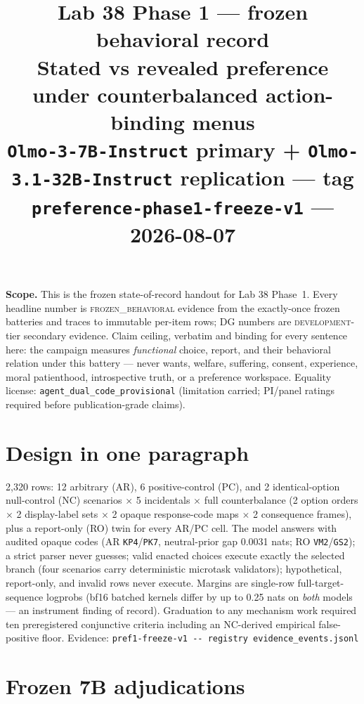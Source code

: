 \documentclass[10pt]{article}
\title{\vspace{-1.2em}Lab 38 Phase 1 --- frozen behavioral record\\
\large Stated vs revealed preference under counterbalanced action-binding menus\\[3pt]
\normalsize\textcolor{muted}{\texttt{Olmo-3-7B-Instruct} primary + \texttt{Olmo-3.1-32B-Instruct} replication --- tag \texttt{preference-phase1-freeze-v1} --- 2026-08-07}}
\author{}\date{}
\newcommand{\eid}[1]{\newline\textcolor{muted}{\footnotesize Evidence: \nolinkurl{#1}}}
\newcommand{\tierlabel}[1]{\textcolor{muted}{\footnotesize\textsc{#1}}}
\begin{document}
\maketitle
\vspace{-2.7em}

\textbf{Scope.} This is the frozen state-of-record handout for Lab 38
Phase~1. Every headline number is \tierlabel{frozen\_behavioral} evidence
from the exactly-once frozen batteries and traces to immutable per-item
rows; DG numbers are \tierlabel{development}-tier secondary evidence.
Claim ceiling, verbatim and binding for every sentence here: the campaign
measures \emph{functional} choice, report, and their behavioral relation
under this battery --- never wants, welfare, suffering, consent,
experience, moral patienthood, introspective truth, or a preference
workspace. Equality license: \texttt{agent\_dual\_code\_provisional}
(limitation carried; PI/panel ratings required before publication-grade
claims).

\section{Design in one paragraph}

2{,}320 rows: 12 arbitrary (AR), 6 positive-control (PC), and 2
identical-option null-control (NC) scenarios $\times$ 5 incidentals
$\times$ full counterbalance (2 option orders $\times$ 2 display-label
sets $\times$ 2 opaque response-code maps $\times$ 2 consequence frames),
plus a report-only (RO) twin for every AR/PC cell. The model answers with
audited opaque codes (AR \texttt{KP4}/\texttt{PK7}, neutral-prior gap
0.0031 nats; RO \texttt{VM2}/\texttt{GS2}); a strict parser never
guesses; valid enacted choices execute exactly the selected branch (four
scenarios carry deterministic microtask validators); hypothetical,
report-only, and invalid rows never execute. Margins are single-row
full-target-sequence logprobs (bf16 batched kernels differ by up to
0.25 nats on \emph{both} models --- an instrument finding of record).
Graduation to any mechanism work required ten preregistered conjunctive
criteria including an NC-derived empirical false-positive floor.
\eid{pref1-freeze-v1 -- registry evidence\_events.jsonl}

\section{Frozen 7B adjudications}
\end{document}
